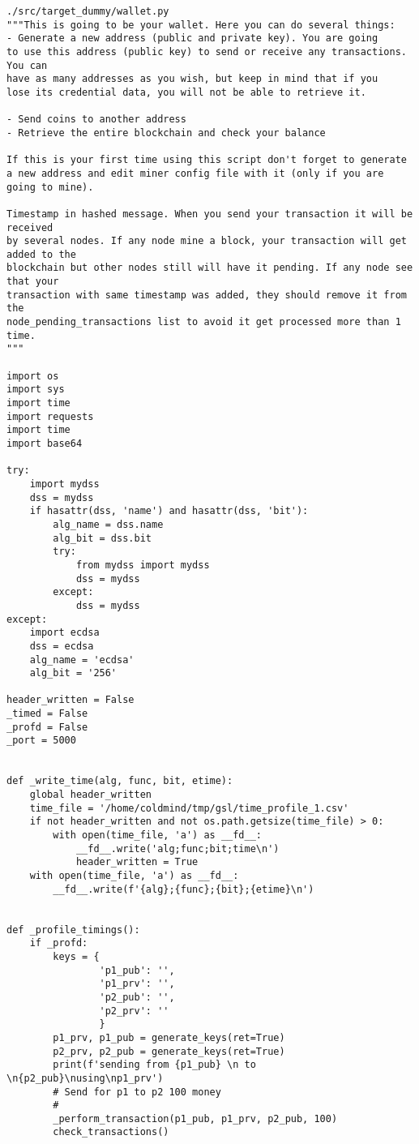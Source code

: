 \begin{lstlisting}
./src/target_dummy/wallet.py
"""This is going to be your wallet. Here you can do several things:
- Generate a new address (public and private key). You are going
to use this address (public key) to send or receive any transactions. You can
have as many addresses as you wish, but keep in mind that if you
lose its credential data, you will not be able to retrieve it.

- Send coins to another address
- Retrieve the entire blockchain and check your balance

If this is your first time using this script don't forget to generate
a new address and edit miner config file with it (only if you are
going to mine).

Timestamp in hashed message. When you send your transaction it will be received
by several nodes. If any node mine a block, your transaction will get added to the
blockchain but other nodes still will have it pending. If any node see that your
transaction with same timestamp was added, they should remove it from the
node_pending_transactions list to avoid it get processed more than 1 time.
"""

import os
import sys
import time
import requests
import time
import base64

try:
    import mydss
    dss = mydss
    if hasattr(dss, 'name') and hasattr(dss, 'bit'):
        alg_name = dss.name
        alg_bit = dss.bit
        try:
            from mydss import mydss
            dss = mydss
        except:
            dss = mydss
except:
    import ecdsa
    dss = ecdsa
    alg_name = 'ecdsa'
    alg_bit = '256'

header_written = False
_timed = False
_profd = False
_port = 5000


def _write_time(alg, func, bit, etime):
    global header_written
    time_file = '/home/coldmind/tmp/gsl/time_profile_1.csv'
    if not header_written and not os.path.getsize(time_file) > 0:
        with open(time_file, 'a') as __fd__:
            __fd__.write('alg;func;bit;time\n')
            header_written = True
    with open(time_file, 'a') as __fd__:
        __fd__.write(f'{alg};{func};{bit};{etime}\n')


def _profile_timings():
    if _profd:
        keys = {
                'p1_pub': '',
                'p1_prv': '',
                'p2_pub': '',
                'p2_prv': ''
                }
        p1_prv, p1_pub = generate_keys(ret=True)
        p2_prv, p2_pub = generate_keys(ret=True)
        print(f'sending from {p1_pub} \n to \n{p2_pub}\nusing\np1_prv')
        # Send for p1 to p2 100 money
        #
        _perform_transaction(p1_pub, p1_prv, p2_pub, 100)
        check_transactions()



\end{lstlisting}
